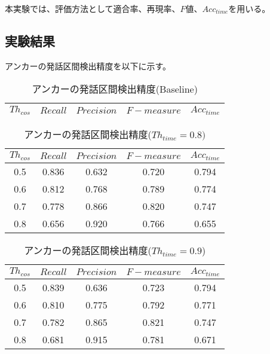本実験では、評価方法として適合率、再現率、$F$値、$Acc_{time}$を用いる。

\subsection{実験結果}
アンカーの発話区間検出精度を以下に示す。


\begin{table}[H]
  \begin{center}
    \caption{アンカーの発話区間検出精度(Baseline) \label{table:result_get_anchor_baseline}}
    \begin{tabular}{|c||c|c|c|c|} \hline
      $Th_{cos}$ & $Recall$ & $Precision$ & $F-measure$ & $Acc_{time}$\\ \hline

    \end{tabular}
  \end{center}
\end{table}

\begin{table}[H]
  \begin{center}
    \caption{アンカーの発話区間検出精度($Th_{time}=0.8)$ \label{table:result_get_anchor08}}
    \begin{tabular}{|c||c|c|c|c|} \hline
      $Th_{cos}$ & $Recall$ & $Precision$ & $F-measure$ & $Acc_{time}$\\ \hline
0.5 & 0.836 & 0.632 & 0.720 & 0.794 \\ \hline
0.6 & 0.812 & 0.768 & 0.789 & 0.774 \\ \hline
0.7 & 0.778 & 0.866 & 0.820 & 0.747 \\ \hline
0.8 & 0.656 & 0.920 & 0.766 & 0.655 \\ \hline

    \end{tabular}
  \end{center}
\end{table}

\begin{table}[H]
  \begin{center}
    \caption{アンカーの発話区間検出精度($Th_{time}=0.9$) \label{table:result_get_anchor09}}
    \begin{tabular}{|c||c|c|c|c|} \hline
      $Th_{cos}$ & $Recall$ & $Precision$ & $F-measure$ & $Acc_{time}$\\ \hline
0.5 & 0.839 & 0.636 & 0.723 & 0.794 \\ \hline
0.6 & 0.810 & 0.775 & 0.792 & 0.771 \\ \hline
0.7 & 0.782 & 0.865 & 0.821 & 0.747 \\ \hline
0.8 & 0.681 & 0.915 & 0.781 & 0.671 \\ \hline

    \end{tabular}
  \end{center}
\end{table}

